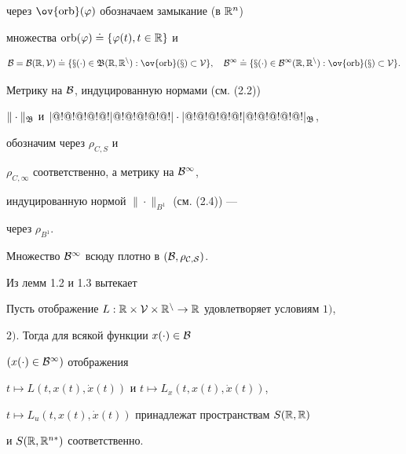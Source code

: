 через $\ov{\orb}(\varphi)$ обозначаем замыкание (в $\Bbb R^n$)


множества $\operatorname{orb}(\varphi)\doteq \{\varphi(t),t\in\Bbb R\}$ и


\begin{equation}


\cal B=\cal B(\Bbb R,\cal V)\doteq


\{x(\cdot)\in\frak B(\Bbb R,\Bbb R^n):


\ov{\orb}(x)\subset\cal V\},\quad \cal B^1\doteq


\{x(\cdot)\in B^{1}(\Bbb R,\Bbb R^n):


\ov{\orb}(x)\subset\cal V\}.


\end{equation} 


Метрику на $\cal B$, индуцированную нормами (см. (2.2))


$\|\cdot\|_{\frak B}$ и $|@!@!@!@!@!|@!@!@!@!@!|\cdot|@!@!@!@!@!|@!@!@!@!@!|_{\frak B}$,


обозначим через $\rho_{C,S}$ и


$\rho_{C,\infty}$ соответственно, а метрику на $\cal B^1$,


индуцированную нормой $\|\cdot\|_{B^1}$ (см. (2.4)) ---


через $\rho_{B^1}$.








\begin{lems}[{\myfont [7]}]


Множество $\cal B^1$ всюду плотно в $(\cal B,\rho_{C,S})$.


\end{lems}





Из лемм 1.2 и 1.3 вытекает








\begin{lems}


Пусть отображение $L:\Bbb R\times\cal V\times\Bbb


R^n\to\Bbb R$ удовлетворяет условиям $1)$,


$2)$. Тогда для всякой функции $x(\cdot)\in\cal B$


$(x(\cdot)\in\cal B^1)$ отображения


$t\mapsto L(t,x(t),\Dot x(t))$ и $t\mapsto L_x(t,x(t),\Dot x(t))$,


$t\mapsto L_u(t,x(t),\Dot x(t))$ принадлежат пространствам $S(\Bbb R,\Bbb R)$


и $S(\Bbb R,\Bbb R^{n*})$ соответственно.


\end{lems}





